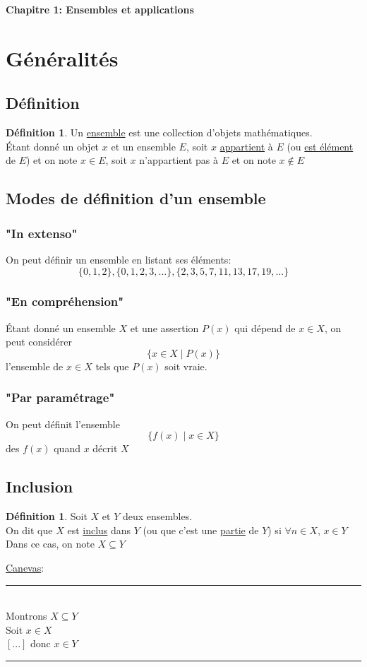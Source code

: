 \documentclass[10pt,a4paper]{article}
\theoremstyle{definition}
\newtheorem{definition}[proposition]{Définition}
\begin{document}
\renewcommand{\labelitemi}{$*$}
\renewcommand{\labelenumi}{(\roman{enumi})}
\begin{center}
{\Large \textbf{Chapitre 1: Ensembles et applications}}
\end{center}

\section{Généralités}
\subsection{Définition}
\begin{definition}
Un \uline{ensemble} est une collection d'objets mathématiques. \\
Étant donné un objet $x$ et un ensemble $E$, soit $x$ \uline{appartient} à $E$ (ou \uline{est élément} de $E$) et on note $x \in E$, soit $x$ n'appartient pas à $E$ et on note $x \not\in E$
\end{definition}

\subsection{Modes de définition d'un ensemble}
\subsubsection{"In extenso"}
\noindent On peut définir un ensemble en listant ses éléments:
\[ \{0, 1, 2\}, \{0, 1, 2, 3, ...\}, \{2, 3, 5, 7, 11, 13, 17, 19, ...\} \]
\subsubsection{"En compréhension"}
\noindent Étant donné un ensemble $X$ et une assertion $P(x)$ qui dépend de $x \in X$, on peut considérer
\[ \{ x \in X \mid P(x) \} \]
l'ensemble de $x \in X$ tels que $P(x)$ soit vraie.
\subsubsection{"Par paramétrage"}
\noindent On peut définit l'ensemble
\[ \{ f(x) \mid x \in X \} \]
des $f(x)$ quand $x$ décrit $X$

\subsection{Inclusion}
\begin{definition}
Soit $X$ et $Y$ deux ensembles. \\
On dit que $X$ est \uline{inclus} dans $Y$ (ou que c'est une \uline{partie} de $Y$) si $\forall n \in X$, $x \in Y$ \\
Dans ce cas, on note $X \subseteq Y$
\end{definition}
\noindent \uline{Canevas}: \\
\rule{10em}{0.5pt} \\
\indent Montrons $X \subseteq Y$ \\
\indent Soit $x \in X$ \\
\indent $[...]$ donc $x \in Y$ \\
\rule{10em}{0.5pt} \medskip
\end{document}
